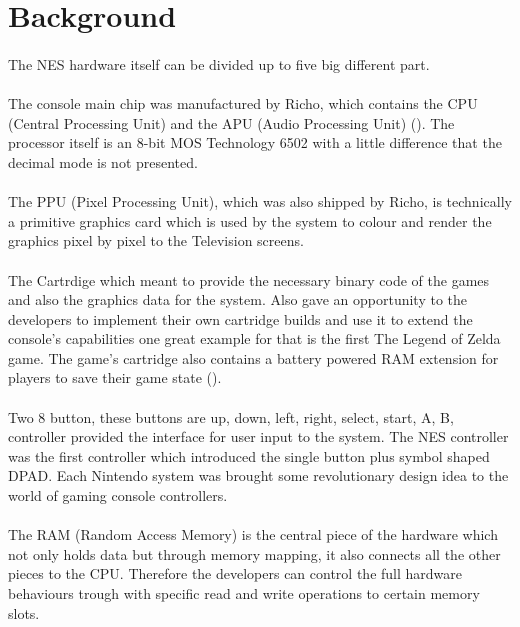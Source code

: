 \documentclass[]{report}
\begin{document}
\section{Background}
\paragraph{ }
The NES hardware itself can be divided up to five big different part. 
\paragraph{ }
The console main chip was manufactured by Richo, which contains the CPU (Central Processing Unit) and the APU (Audio Processing Unit) (\cite{CPU}).  
The processor itself is an 8-bit MOS Technology 6502 with a little difference that the decimal mode is not presented. 
\paragraph{ }
The PPU (Pixel Processing Unit), which was also shipped by Richo, is technically a primitive graphics card which is used by the system to colour and render the graphics pixel by pixel to the Television screens.
\paragraph{ }
The Cartrdige which meant to provide the necessary binary code of the games and also the graphics data for the system. Also gave an opportunity to the developers to implement their own cartridge builds and use it to extend the console's capabilities one great example for that is the first The Legend of Zelda game. The game's cartridge also contains a battery powered RAM extension for players to save their game state (\cite{ZELD}).
\paragraph{ }
Two 8 button, these buttons are up, down, left, right, select, start, A, B, controller provided the interface for user input to the system. The NES controller was the first controller which introduced the single button plus symbol shaped DPAD. Each Nintendo system was brought some revolutionary design idea to the world of gaming console controllers.
\paragraph{ }
The RAM (Random Access Memory) is the central piece of the hardware which not only holds data but through memory mapping, it also connects all the other pieces to the CPU. Therefore the developers can control the full hardware behaviours trough with specific read and write operations to certain memory slots.
\end{document}
